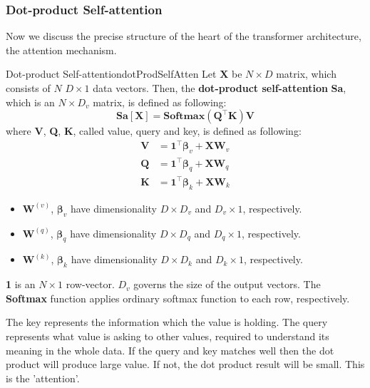 \documentclass{article}
\begin{document}
        \subsubsection{Dot-product Self-attention}
            Now we discuss the precise structure of the heart of the transformer architecture, the attention mechanism.

            \begin{defn}{Dot-product Self-attention}{dotProdSelfAtten}
                Let $\textbf{X}$ be $N \times D$ matrix, which consists of $N$ $D \times 1$ data vectors.
                Then, the \textbf{dot-product self-attention} \textbf{Sa}, which is an $N \times D_v$ matrix, is defined as following:
                \[
                \textbf{Sa}[\textbf{X}]=\textbf{Softmax}\left( \textbf{Q}^{\top}\textbf{K}\right)\textbf{V}
                \]
                where \textbf{V}, \textbf{Q}, \textbf{K}, called value, query and key, is defined as following:
                \begin{align*}
                    \textbf{V} &= \textbf{1}^{\top}\bm{\beta}_v + \textbf{X}\textbf{W}_v \\
                    \textbf{Q} &= \textbf{1}^{\top}\bm{\beta}_q + \textbf{X}\textbf{W}_q \\
                    \textbf{K} &= \textbf{1}^{\top}\bm{\beta}_k + \textbf{X}\textbf{W}_k
                \end{align*}
                
                \begin{itemize}
                    \item $\textbf{W}^{(v)}$, $\bm{\beta}_v$ have dimensionality $D \times D_v$ and $D_v \times 1$, respectively.
                    \item $\textbf{W}^{(q)}$, $\bm{\beta}_q$ have dimensionality $D \times D_q$ and $D_q \times 1$, respectively.
                    \item $\textbf{W}^{(k)}$, $\bm{\beta}_k$ have dimensionality $D \times D_k$ and $D_k \times 1$, respectively.
                \end{itemize}
                
                \textbf{1} is an $N \times 1$ row-vector. 
                $D_v$ governs the size of the output vectors.
                The \textbf{Softmax} function applies ordinary softmax function to each row, respectively.
            \end{defn}
            The key represents the information which the value is holding.
            The query represents what value is asking to other values, required to understand its meaning in the whole data.
            If the query and key matches well then the dot product will produce large value.
            If not, the dot product result will be small. This is the 'attention'.
\end{document}
